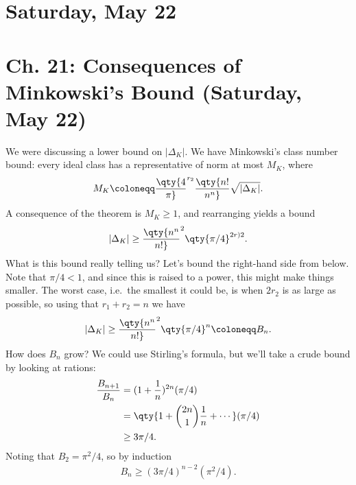 \hypertarget{saturday-may-22}{%
\section{Saturday, May 22}\label{saturday-may-22}}

\hypertarget{ch.-21-consequences-of-minkowskis-bound-saturday-may-22}{%
\section{Ch. 21: Consequences of Minkowski's Bound (Saturday, May
22)}\label{ch.-21-consequences-of-minkowskis-bound-saturday-may-22}}

\begin{remark}

We were discussing a lower bound on
\({\left\lvert {{\Delta}_K} \right\rvert}\). We have Minkowski's class
number bound: every ideal class has a representative of norm at most
\(M_K\), where
\begin{align*}
M_K \coloneqq\qty{4\over \pi}^{r_2} \qty{n! \over n^n}\sqrt{{\left\lvert {{\Delta}_K} \right\rvert}}
.\end{align*}
A consequence of the theorem is \(M_K \geq 1\), and rearranging yields a
bound
\begin{align*}
{\left\lvert {{\Delta}_K} \right\rvert} \geq \qty{n^n \over n!}^2 \qty{\pi/4}^{2r)2}
.\end{align*}
What is this bound really telling us? Let's bound the right-hand side
from below. Note that \(\pi/4<1\), and since this is raised to a power,
this might make things smaller. The worst case, i.e.~the smallest it
could be, is when \(2r_2\) is as large as possible, so using that
\(r_1 + r_2 = n\) we have
\begin{align*}
{\left\lvert {{\Delta}_K} \right\rvert} \geq \qty{n^n\over n!}^2 \qty{\pi/4}^n \coloneqq B_n
.\end{align*}
How does \(B_n\) grow? We could use Stirling's formula, but we'll take a
crude bound by looking at rations:
\begin{align*}
{B_{n+1} \over B_n} 
&= (1 + {1\over n})^{2n} (\pi/4)\\
&= \qty{ 1 + {2n \choose 1} {1\over n} + \cdots }(\pi/4) \\
&\geq 3\pi/4
.\end{align*}
Noting that \(B_2 = \pi^2/4\), so by induction
\begin{align*}
B_n \geq (3\pi/4)^{n-2} (\pi^2/4)
.\end{align*}

\end{remark}

